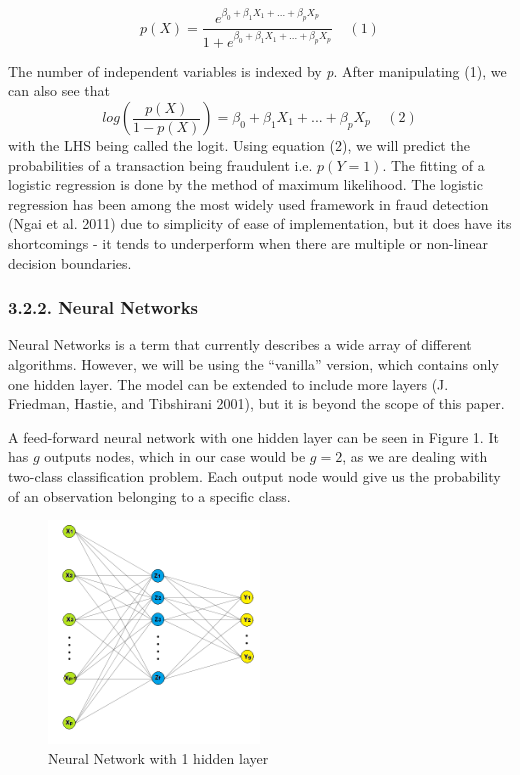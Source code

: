 \documentclass[12pt,]{article}
\begin{document}
\[p(X) = \frac{e^{\beta_0 + \beta_1X_1 + ... + \beta_pX_p}}{1 + e^{\beta_0 + \beta_1X_1 + ... + \beta_pX_p}}\;\;\;\;(1)\]

The number of independent variables is indexed by \emph{p}. After
manipulating (1), we can also see that
\[log(\frac{p(X)}{1-p(X)})=\beta_0+ \beta_1X_1 + ... + \beta_pX_p\;\;\;\;(2)\]
with the LHS being called the logit. Using equation (2), we will predict
the probabilities of a transaction being fraudulent i.e. \(p(Y = 1)\).
The fitting of a logistic regression is done by the method of maximum
likelihood. The logistic regression has been among the most widely used
framework in fraud detection (Ngai et al. 2011) due to simplicity of
ease of implementation, but it does have its shortcomings - it tends to
underperform when there are multiple or non-linear decision boundaries.

\hypertarget{neural-networks}{%
\subsubsection{3.2.2. Neural Networks}\label{neural-networks}}

Neural Networks is a term that currently describes a wide array of
different algorithms. However, we will be using the ``vanilla'' version,
which contains only one hidden layer. The model can be extended to
include more layers (J. Friedman, Hastie, and Tibshirani 2001), but it
is beyond the scope of this paper.

A feed-forward neural network with one hidden layer can be seen in
Figure 1. It has \(g\) outputs nodes, which in our case would be
\(g=2\), as we are dealing with two-class classification problem. Each
output node would give us the probability of an observation belonging to
a specific class.

\begin{figure}
\centering
\includegraphics[width=0.5\textwidth,height=\textheight]{figures/nnet.png}
\caption{Neural Network with 1 hidden layer}
\end{figure}
\end{document}
